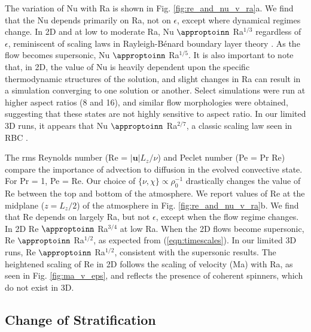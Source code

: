 \documentclass[aps, prfluids, onecolumn, notitlepage, nofootinbib, groupedaddress, amsfonts, amssymb, amsmath]{revtex4-1}
\newcommand{\RB}{Rayleigh-B\'{e}nard }
\newcommand{\approptoinn}[2]{\mathrel{\vcenter{
	\offinterlineskip\halign{\hfil$##$\cr
	#1\propto\cr\noalign{\kern2pt}#1\sim\cr\noalign{\kern-2pt}}}}}
\newcommand{\appropto}{\mathpalette\approptoinn\relax}
\begin{document}
The variation of Nu with Ra is shown in 
Fig. \ref{fig:re_and_nu_v_ra}a.  We find that the Nu depends primarily
on Ra, not on $\epsilon$, except where dynamical regimes change.
In 2D and at low to moderate Ra, 
Nu $\appropto$ Ra$^{1/3}$ regardless of $\epsilon$,
reminiscent of scaling laws in \RB boundary layer theory 
\cite{grossman&lohse2000, ahlers&all2009, king&all2012}.
As the flow becomes supersonic,  Nu $\appropto$ Ra$^{1/5}$.
It is also important to note that, in 2D,
the value of Nu is heavily dependent upon the specific thermodynamic
structures of the solution, and slight changes in
Ra can result in a simulation converging to one solution or another. 
Select simulations were run at higher aspect ratios (8 and 16), and similar flow
morphologies were obtained, suggesting that these states are not highly
sensitive to aspect ratio.
In our limited 3D runs, it appears that Nu $\appropto$ Ra$^{2/7}$, a classic scaling law
seen in RBC \cite{johnston&doering2009}.

The rms Reynolds number (Re = $|\bm{u}|L_z/\nu$) and Peclet number
(Pe = Pr Re)
compare the importance of advection to diffusion in the evolved
convective state.  For Pr = 1, Pe = Re.  
Our choice of $\{\nu,\chi\}\propto \rho_0^{-1}$ drastically changes
the value of Re between the top and bottom of the atmosphere.  We report values of
Re at the midplane ($z=L_z/2$) of the atmosphere in
Fig. \ref{fig:re_and_nu_v_ra}b.  We find that Re
depends on largely Ra, but not $\epsilon$, except when the flow regime
changes.
In 2D Re $\appropto$ Ra$^{3/4}$ at low Ra.    When the 2D flows
become supersonic, 
Re $\appropto$ Ra$^{1/2}$, as expected
from (\ref{eqn:timescales}).
In our limited 3D runs,
Re $\appropto$ Ra$^{1/2}$, consistent with the supersonic results.
The heightened scaling
of Re in 2D follows the scaling of velocity (Ma) with Ra, as
seen in Fig. \ref{fig:ma_v_eps}, and reflects the presence of coherent
spinners, which do not exist in 3D.

\subsection{Change of Stratification}
\end{document}
